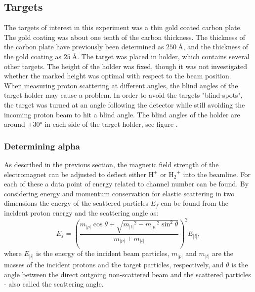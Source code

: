 \subsection{Targets}
The targets of interest in this experiment was a thin gold coated carbon plate. The gold coating was about one tenth of the carbon thickness. The thickness of the carbon plate have previously been determined as $\SI{250}{\angstrom}$, and the thickness of the gold coating as $\SI{25}{\angstrom}$.\footnotemark {} 
The target was placed in holder, which contains several other targets. The height of the holder was fixed, though it was not investigated whether the marked height was optimal with respect to the beam position.\\

When measuring proton scattering at different angles, the blind angles of the target holder may cause a problem. In order to avoid the targets "blind-spots", the target was turned at an angle following the detector while still avoiding the incoming proton beam to hit a blind angle. The blind angles of the holder are around $\pm 30 \si{\degree}$ in each side of the target holder, see figure .  
  
\subsubsection{Determining alpha}
As described in the previous section, the magnetic field strength of the
electromagnet can be adjusted to deflect either $\mathrm{H^+}$ or
$\mathrm{{H_2}^+}$ into the beamline. For each of these a data point of energy
related to channel number can be found.
By considering energy and momentum conservation for elastic scattering in two
dimensions the energy of the scattered particles $E_f$ can be found from the
incident proton energy and the scattering angle as:
\begin{equation}
E_f = \left( \frac{m_|p| \cos\theta + \sqrt{{m_|t|}^2 - {m_|p|}^2
\sin^2\theta}}{m_|p|+m_|t|} \right)^2 E_|i|,
\label{eq_5}
\end{equation}
where $E_|i|$ is the energy of the incident beam particles, $m_|p|$ and $m_|t|$ are
the masses of the incident protons and the target particles, respectively, and
$\theta$ is the angle between the direct outgoing non-scattered beam and the
scattered particles - also called the scattering angle.

